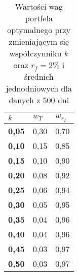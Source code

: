 \documentclass[magister]{dyplom}
\begin{document}
\begin{table}[ht]
	\centering
	\caption{Wartości wag portfela optymalnego przy zmieniającym się współczynniku $k$ oraz $r_f = 2\%$ i średnich jednodniowych dla danych z 500 dni}
	\begin{tabular}{|l|l|l|}
		\hline
		\textbf{$k$} & \textbf{$w_T$} & \textbf{$w_{r_f}$} \\ \hline
		\textbf{0,05}                                             & 0,30           & 0,70            \\ \hline
		\textbf{0,10}                                              & 0,15          & 0,85           \\ \hline
		\textbf{0,15}                                             & 0,10           & 0,90           \\ \hline
		\textbf{0,20}                                              & 0,08          & 0,92           \\ \hline
		\textbf{0,25}                                             & 0,06          & 0,94           \\ \hline
		\textbf{0,30}                                              & 0,05          & 0,95           \\ \hline
		\textbf{0,35}                                             & 0,04          & 0,96           \\ \hline
		\textbf{0,40}                                              & 0,04          & 0,96           \\ \hline
		\textbf{0,45}                                             & 0,03          & 0,97           \\ \hline
		\textbf{0,50}                                              & 0,03          & 0,97           \\ \hline
	\end{tabular}
\end{table}
\end{document}
